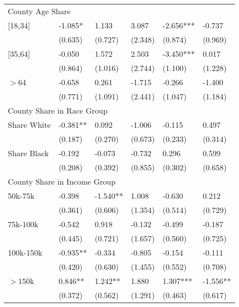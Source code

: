 \documentclass[12pt]{article}
\begin{document}
{\begin{tabular}{llllll}
\hline
\multicolumn{6}{l}{County Age Share}\\
\hspace{0.1in}[18,34]				&	-1.085*	&	1.133	&	3.087	&	-2.656***	&	-0.737	\\
													&	(0.635)	&	(0.727)	&	(2.348)	&	(0.874)	&	(0.969)	\\
\hspace{0.1in}[35,64]				&	-0.050	&	1.572	&	2.503	&	-3.450***	&	0.017	\\
													&	(0.864)	&	(1.016)	&	(2.744)	&	(1.100)	&	(1.228)	\\
\hspace{0.1in} $>$64	&	-0.658	&	0.261	&	-1.715	&	-0.266	&	-1.400	\\
													& (0.771)	&	(1.091)	&	(2.441)	&	(1.047)	&	(1.184)	\\
\hline
\multicolumn{6}{l}{County Share in Race Group}\\
\hspace{0.1in} Share White			&	-0.381**	&	0.092	&	-1.006	&	-0.115	&	0.497	\\
													&	(0.187)	&	(0.270)	&	(0.673)	&	(0.233)	&	(0.314)	\\
\hspace{0.1in} Share Black			&	-0.192	&	-0.073	&	-0.732	&	0.296	&	0.599	\\
													&	(0.208)	&	(0.392)	&	(0.855)	&	(0.302)	&	(0.658)	\\
\hline
\multicolumn{6}{l}{County Share in Income Group}\\
\hspace{0.1in}	50k-75k 				&	-0.398	&	-1.540**	&	1.008	&	-0.630	&	0.212	\\
													&	(0.361)	&	(0.606)	&	(1.354)	&	(0.514)	&	(0.729)	\\
\hspace{0.1in} 75k-100k			&	-0.542	&	0.918	&	-0.132	&	-0.499	&	-0.187	\\
													&	(0.445)	&	(0.721)	&	(1.657)	&	(0.560)	&	(0.725)	\\
\hspace{0.1in} 100k-150k			&	-0.935**	&	-0.334	&	-0.805	&	-0.154	&	-0.111	\\
													&	(0.420)	&	(0.630)	&	(1.455)	&	(0.552)	&	(0.708)	\\
\hspace{0.1in}$>$150k				&	0.846**	&	1.242**	&	1.880	&	1.307***	&	-1.556**	\\
													&	(0.372)	&	(0.562)	&	(1.291)	&	(0.463)	&	(0.617)	\\
\hline
\end{tabular}
}
\end{document}
